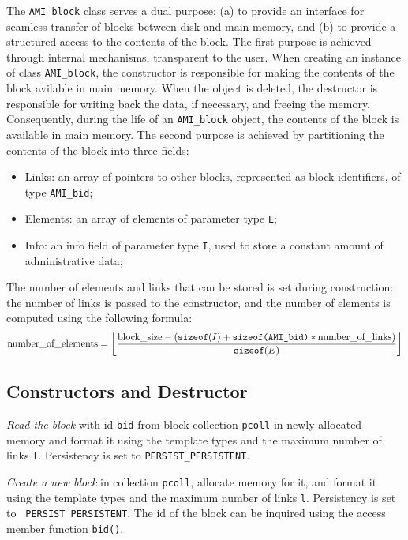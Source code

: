 The {\tt AMI\_block} class serves a dual purpose: (a) to provide an
interface for seamless transfer of blocks between disk and main memory,
and (b) to provide a structured access to the contents of the block.
The first purpose is achieved through internal mechanisms, transparent
to the user. When creating an instance of class {\tt AMI\_block}, the
constructor is responsible for making the contents of the block
avilable in main memory. When the object is deleted, the destructor is
responsible for writing back the data, if necessary, and freeing the
memory. Consequently, during the life of an {\tt AMI\_block} object, the
contents of the block is available in main memory.
The second purpose is achieved by partitioning the contents of the block
into three fields:
\begin{itemize}
\item[] Links: an array of pointers to other blocks, represented as
block identifiers, of type {\tt AMI\_bid};
\item[] Elements: an array of elements of parameter type {\tt E};
\item[] Info: an info field of parameter type {\tt I}, used to store a 
constant amount of administrative data;
\end{itemize}

The number of elements and links that can be stored is set during
construction: the number of links is passed to the constructor, and the
number of elements is computed using the following formula:
\[\mbox{\rm number\_of\_elements} = \left\lfloor\frac{\mbox{\rm
block\_size} - (\mbox{\tt sizeof}(I) + \mbox{\tt sizeof(AMI\_bid)} *
\mbox{\rm number\_of\_links})}{\mbox{\tt sizeof}(E)}\right\rfloor \]

\subsection{Constructors and Destructor}

   \btabb 

	 {{\em Read the block} with id {\tt bid} from block collection
	{\tt *pcoll} in newly allocated memory and format it using the
	template types and the maximum number of links {\tt l}. Persistency
	is set to {\tt PERSIST\_PERSISTENT}.}

	 {{\em
	Create a new block} in collection {\tt *pcoll}, allocate memory for
	it, and format it using the template types and the maximum number
	of links {\tt l}. Persistency is set to {\tt
	PERSIST\_PERSISTENT}. The id of the block can be inquired using the
	access member function {\tt bid()}.}

